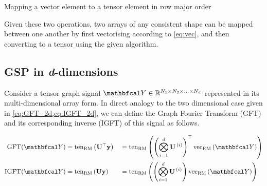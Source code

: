 \begin{algorithm}[b]
    \hypertarget{vectoten}{}
    \label{al:vectoten}
    \caption{Mapping a vector element to a tensor element in row major order}
    \begin{algorithmic}
    \vspace{0.15cm}
    \vspace{0.1cm}
    \vspace{0.25cm}
    \vspace{0.25cm}
    \vspace{0.25cm}
    \vspace{0.15cm}
    \vspace{0.15cm}
    \EndFor
    \vspace{0.25cm}
    \end{algorithmic}
\end{algorithm}



Given these two operations, two arrays of any consistent shape can be mapped between one another by first vectorising according to \cref{eq:vec}, and then converting to a tensor using the given algorithm.



\subsection{GSP in \textit{d}-dimensions}



Consider a tensor graph signal $\Yt \in \R^{N_1 \times N_2 \times ... \times N_d}$ represented in its multi-dimensional array form. In direct analogy to the two dimensional case given in \cref{eq:GFT_2d,eq:IGFT_2d}, we can define the Graph Fourier Transform (GFT) and its corresponding inverse (IGFT) of this signal as follows. 

\begin{alignat}{2}
\label{eq:gft_nd}
    \text{GFT}(\Yt) & = \tenrm{\U^\top \y} && = \tenrm{\left(  \bigotimes_{i=1}^d  \U^{\,(i)} \right)^\top \vecrm{\Yt} } \\
\label{eq:igft_nd}
    \text{IGFT}(\Yt) & = \tenrm{\U \y} && = \tenrm{\left(  \bigotimes_{i=1}^d  \U^{\,(i)} \right) \vecrm{\Yt} }
\end{alignat}


